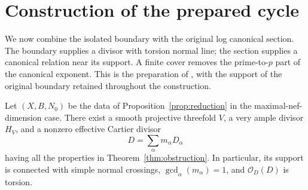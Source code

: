 \section{Construction of the prepared cycle}\label{sec:cycle}

We now combine the isolated boundary with the original log canonical
section.  The boundary supplies a divisor with torsion normal line;
the section supplies a canonical relation near its support.  A finite
cover removes the prime-to-$p$ part of the canonical exponent.  This
is the preparation of \cite[Sections~2.7--2.8]{Companion}, with the
support of the original boundary retained throughout the construction.

\begin{proposition}\label{prop:prepared}
Let $(X,B,N_0)$ be the data of Proposition~\ref{prop:reduction}
in the maximal-nef-dimension case.  There exist
a smooth projective threefold $V$, a very ample divisor $H_V$, and a
nonzero effective Cartier divisor
\[
 D=\sum_\alpha m_\alpha D_\alpha
\]
having all the properties in Theorem~\ref{thm:obstruction}.  In
particular, its support is connected with simple normal crossings,
$\gcd_\alpha(m_\alpha)=1$, and $\mathcal O_D(D)$ is torsion.
\end{proposition}

